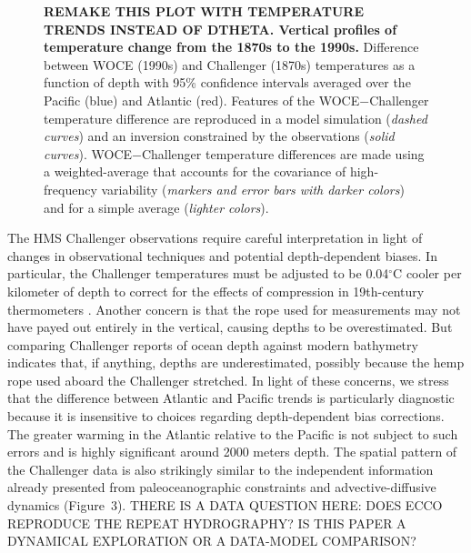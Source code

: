 \documentclass[authoryear,round,12pt]{article}
\begin{document}
\begin{figure}[htbp]
\begin{center}
  \caption{{\bf REMAKE THIS PLOT WITH TEMPERATURE TRENDS INSTEAD OF
      DTHETA. Vertical profiles of temperature change from the 1870s
      to the 1990s.} Difference between WOCE (1990s) and Challenger
    (1870s) temperatures as a function of depth with 95\% confidence
    intervals averaged over the Pacific (blue) and Atlantic (red).
    Features of the WOCE$-$Challenger temperature difference are
    reproduced in a model simulation ({\it dashed curves}) and an
    inversion constrained by the observations ({\it solid curves}).
    WOCE$-$Challenger temperature differences are made using a
    weighted-average that accounts for the covariance of
    high-frequency variability ({\it markers and error bars with
      darker colors}) and for a simple average ({\it lighter
      colors}).}
\end{center} 
\end{figure}

The HMS Challenger observations require careful interpretation in
light of changes in observational techniques and potential
depth-dependent biases. In particular, the Challenger temperatures
must be adjusted to be 0.04$^\circ$C cooler per kilometer of depth to
correct for the effects of compression in 19th-century thermometers
\citep{Tait--1882:Pressure}.  Another concern is that the rope used
for measurements may not have payed out entirely in the vertical,
causing depths to be overestimated. But comparing Challenger reports
of ocean depth against modern bathymetry
\citep{Intergovernm--2008:BODC} indicates that, if anything, depths
are underestimated, possibly because the hemp rope used aboard the
Challenger stretched.  In light of these concerns, we stress that the
difference between Atlantic and Pacific trends is particularly
diagnostic because it is insensitive to choices regarding
depth-dependent bias corrections.  The greater warming in the Atlantic
relative to the Pacific is not subject to such errors and is highly
significant around 2000 meters depth. The spatial pattern of the
Challenger data is also strikingly similar to the independent
information already presented from paleoceanographic constraints and
advective-diffusive dynamics (Figure~3). THERE IS A DATA QUESTION
HERE: DOES ECCO REPRODUCE THE REPEAT HYDROGRAPHY? IS THIS PAPER A
DYNAMICAL EXPLORATION OR A DATA-MODEL COMPARISON?
\end{document}
